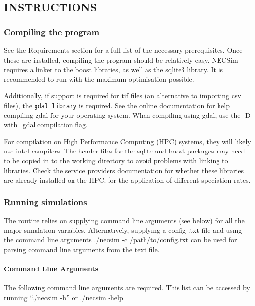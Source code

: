 \subsection*{I\+N\+S\+T\+R\+U\+C\+T\+I\+O\+NS}

\subsubsection*{Compiling the program}

See the Requirements section for a full list of the necessary prerequisites. Once these are installed, compiling the program should be relatively easy. N\+E\+C\+Sim requires a linker to the boost libraries, as well as the sqlite3 library. It is recommended to run with the maximum optimisation possible.

Additionally, if support is required for tif files (an alternative to importing csv files), the \href{http://www.gdal.org/}{\tt gdal library} is required. See the online documentation for help compiling gdal for your operating system. When compiling using gdal, use the {\ttfamily -\/D with\+\_\+gdal} compilation flag.

For compilation on High Performance Computing (H\+PC) systems, they will likely use intel compilers. The header files for the sqlite and boost packages may need to be copied in to the working directory to avoid problems with linking to libraries. Check the service providers\textquotesingle{} documentation for whether these libraries are already installed on the H\+PC. for the application of different speciation rates.

\subsubsection*{Running simulations}

The routine relies on supplying command line arguments (see below) for all the major simulation variables. Alternatively, supplying a config .txt file and using the command line arguments {\ttfamily ./necsim -\/c /path/to/config.txt} can be used for parsing command line arguments from the text file.

\paragraph*{Command Line Arguments}

The following command line arguments are required. This list can be accessed by running {\ttfamily “./necsim -\/h”} or {\ttfamily ./necsim -\/help}

